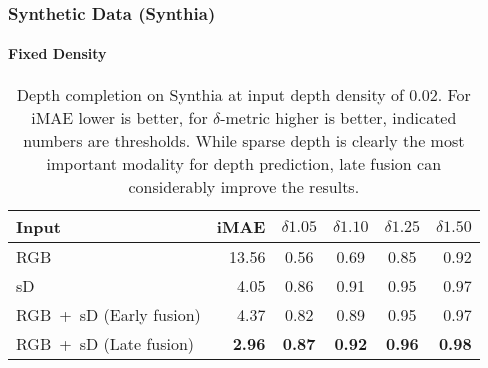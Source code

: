 \documentclass[10pt,twocolumn,letterpaper]{article}
\begin{document}
\subsubsection{Synthetic Data (Synthia)}\label{sec:expDepthSynthia}
\paragraph{Fixed Density}


\begin{table}
	\scriptsize
	\centering
	\begin{tabular}{lrcccr}  
		\toprule
		Input & iMAE & $\delta1.05$ & $\delta1.10$ & $\delta1.25$ & $\delta1.50$ \\
		\midrule
		RGB & 13.56 & 0.56 & 0.69 & 0.85 & 0.92 \\
		sD & 4.05 & 0.86 & 0.91 & 0.95 & 0.97 \\
		RGB~+~sD (Early fusion) & 4.37 & 0.82 & 0.89 & 0.95 & 0.97 \\
		RGB~+~sD (Late fusion) & \textbf{2.96} & \textbf{0.87} & \textbf{0.92} & \textbf{0.96} & \textbf{0.98} \\
		\bottomrule
	\end{tabular}
	\caption{Depth completion on Synthia at input depth density of 0.02. For iMAE lower is better, for $\delta$-metric higher is better, indicated numbers are thresholds. While sparse depth is clearly the most important modality for depth prediction, late fusion can considerably improve the results.}
	\label{tab:depthCompletionSynthetic}
\end{table}
\end{document}
